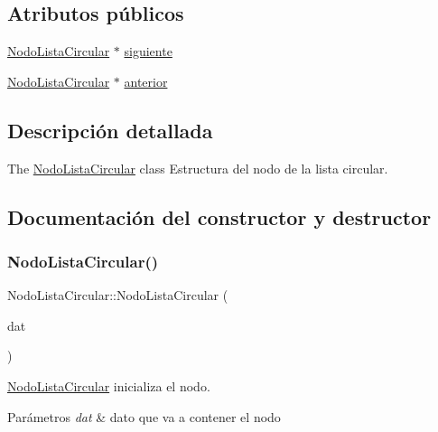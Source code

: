 \subsection*{Atributos públicos}
\begin{DoxyCompactItemize}
\item 
\mbox{\hyperlink{class_nodo_lista_circular}{Nodo\+Lista\+Circular}} $\ast$ \mbox{\hyperlink{class_nodo_lista_circular_a689ddba0f9da231ef3bfdcd4a0d45ae3}{siguiente}}
\item 
\mbox{\hyperlink{class_nodo_lista_circular}{Nodo\+Lista\+Circular}} $\ast$ \mbox{\hyperlink{class_nodo_lista_circular_a62c97352f8df5d9b817568467d90ee33}{anterior}}
\end{DoxyCompactItemize}


\subsection{Descripción detallada}
The \mbox{\hyperlink{class_nodo_lista_circular}{Nodo\+Lista\+Circular}} class Estructura del nodo de la lista circular. 

\subsection{Documentación del constructor y destructor}
\mbox{\label{class_nodo_lista_circular_a545fa0b7acf627390514fe87b6aff277}} 
\subsubsection{\texorpdfstring{Nodo\+Lista\+Circular()}{NodoListaCircular()}}
{\footnotesize\ttfamily Nodo\+Lista\+Circular\+::\+Nodo\+Lista\+Circular (\begin{DoxyParamCaption}\item[{Q\+String}]{dat }\end{DoxyParamCaption})\hspace{0.3cm}{\ttfamily [inline]}}



\mbox{\hyperlink{class_nodo_lista_circular}{Nodo\+Lista\+Circular}} inicializa el nodo. 


\begin{DoxyParams}{Parámetros}
{\em dat} & dato que va a contener el nodo \\
\hline
\end{DoxyParams}


